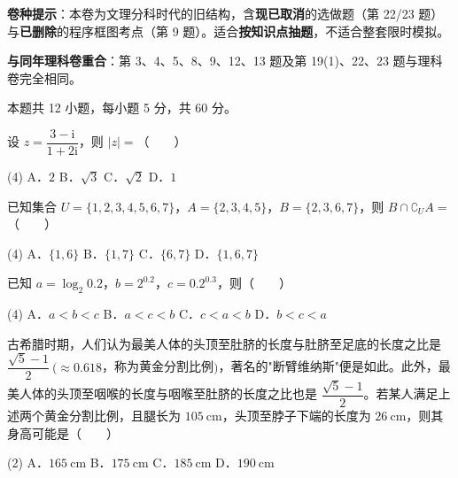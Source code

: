 

\begin{gknotice}
\textbf{ 卷种提示}：本卷为文理分科时代的旧结构，含\textbf{现已取消}的选做题（第 22/23 题）与\textbf{已删除}的程序框图考点（第 9 题）。适合\textbf{按知识点抽题}，不适合整套限时模拟。

\textbf{与同年理科卷重合}：第 3、4、5、8、9、12、13 题及第 19(1)、22、23 题与理科卷完全相同。
\end{gknotice}

\par\medskip


\begin{gktip}
本题共 12 小题，每小题 5 分，共 60 分。
\end{gktip}

设 $z=\dfrac{3-\mathrm i}{1+2\mathrm i}$，则 $|z|=$（　　）

\begin{gkopts}(4)
\task A．$2$
\task B．$\sqrt3$
\task C．$\sqrt2$
\task D．$1$
\end{gkopts}

已知集合 $U=\{1,2,3,4,5,6,7\}$，$A=\{2,3,4,5\}$，$B=\{2,3,6,7\}$，则 $B\cap\complement_U A=$（　　）

\begin{gkopts}(4)
\task A．$\{1,6\}$
\task B．$\{1,7\}$
\task C．$\{6,7\}$
\task D．$\{1,6,7\}$
\end{gkopts}

已知 $a=\log_2 0.2$，$b=2^{0.2}$，$c=0.2^{0.3}$，则（　　）

\begin{gkopts}(4)
\task A．$a<b<c$
\task B．$a<c<b$
\task C．$c<a<b$
\task D．$b<c<a$
\end{gkopts}

古希腊时期，人们认为最美人体的头顶至肚脐的长度与肚脐至足底的长度之比是 $\dfrac{\sqrt5-1}2\ (\approx0.618$，称为黄金分割比例$)$，著名的"断臂维纳斯"便是如此。此外，最美人体的头顶至咽喉的长度与咽喉至肚脐的长度之比也是 $\dfrac{\sqrt5-1}2$。若某人满足上述两个黄金分割比例，且腿长为 $105\ \mathrm{cm}$，头顶至脖子下端的长度为 $26\ \mathrm{cm}$，则其身高可能是（　　）

\begin{gkopts}(2)
\task A．$165\ \mathrm{cm}$
\task B．$175\ \mathrm{cm}$
\task C．$185\ \mathrm{cm}$
\task D．$190\ \mathrm{cm}$
\end{gkopts}

